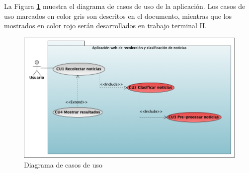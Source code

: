 


La Figura \textbf{\ref{fig:DCU}} muestra el diagrama de casos de uso de la aplicación. Los casos de uso marcados en color gris son descritos en el documento, mientras que los mostrados en color rojo serán desarrollados en trabajo terminal II.

\begin{figure}[h]
  \centering
  \includegraphics[scale=.4]{imagenes/Diagramas/CasosDeuso/CasosDeuso}
  \caption{Diagrama de casos de uso}
  \label{fig:DCU}
\end{figure}
